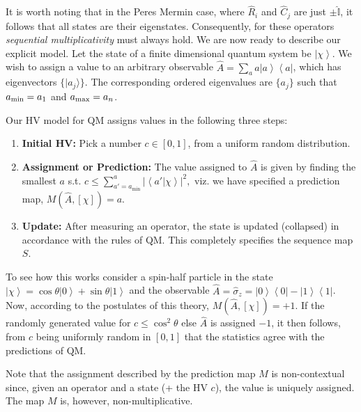 \documentclass[british,aps,prl,superscriptaddress,nofootinbib,times,reprint]{revtex4-1}
\theoremstyle{plain}
\theoremstyle{plain}
\theoremstyle{definition}
\theoremstyle{remark}
\theoremstyle{remark}
\theoremstyle{remark}
\theoremstyle{plain}
\theoremstyle{plain}
\theoremstyle{plain}
\theoremstyle{definition}
\theoremstyle{definition}
\begin{document}
It is worth noting that in the Peres Mermin
case, where $\hat{R}_{i}$ and $\hat{C}_{j}$ are
just $\pm\hat{\mathbb{I}}$, it follows that all
states are their eigenstates. Consequently, for
these operators \emph{sequential multiplicativity}
must always hold.
We are now ready to describe our explicit model.
Let the state of a finite dimensional quantum system
be $\left|\chi\right\rangle $. We wish to
assign a value to an arbitrary observable 
$\hat{A}=\sum_{a}a\left|a\right\rangle
\left\langle a\right|$, which has 
eigenvectors $\{ \vert
a_j\rangle \}$. The corresponding ordered eigenvalues are $\{a_j\}$ such that 
$a_{\rm min}=a_1$
and 
$a_{\rm max}=a_n$.

Our HV model for QM assigns values in the following
three steps:
\setdefaultleftmargin{0pt}{}{}{}{}{}
\begin{enumerate}
\item
{\bf Initial HV:} Pick a number
$c\in[0,1]$, from a uniform random distribution.\
\item
{\bf
Assignment or Prediction:}
 The value assigned to
$\hat{A}$ is given by finding the smallest $a$
s.t.  $c\le\sum_{a'=a_{\text{min}}}^{a}\left|\left\langle
a'|\chi\right\rangle \right|^{2},$ viz. we have
specified a prediction map, $M(\hat{A},[\chi ])=a$.
\item
{\bf Update:} After measuring an operator, the state is
updated (collapsed) in accordance with the rules
of QM. This completely specifies the sequence map
$S$.
\end{enumerate}
To see how this works consider 
a spin-half particle in the state
$\left|\chi\right\rangle
=\cos\theta\left|0\right\rangle
+\sin\theta\left|1\right\rangle $ and the observable
$\hat{A}=\hat{\sigma}_{z}=\left|0\right\rangle
\left\langle 0\right|-\left|1\right\rangle
\left\langle 1\right|$. Now, according to the
postulates of this theory, $M(\hat{A},[\chi])=+1$.
If
the randomly generated value for 
$c\le\cos^{2}\theta$ else $\hat{A}$ is assigned
$-1$, it then follows,  from $c$ being uniformly
random in $[0,1]$ that the statistics agree with
the predictions of QM.

Note that the assignment described by the
prediction map $M$ is non-contextual since, given
an operator and a state (+ the HV $c$), the value is
uniquely assigned. The map $M$ is, however,
non-multiplicative. 
\end{document}
